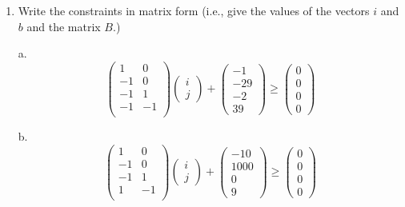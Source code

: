 \documentclass[11pt]{article}
\begin{document}
\begin{enumerate}
\begin{Answer}
\begin{figure}[H]
		      \end{figure}
	      \end{Answer}
	      \newpage
	\item Write the constraints in matrix form (i.e., give the values of the vectors $i$ and $b$ and the matrix $B$.)
	      \begin{Answer}
		      a.
		      $$
			      \begin{pmatrix}
				      1  & 0  \\
				      -1 & 0  \\
				      -1 & 1  \\
				      -1 & -1 \\
			      \end{pmatrix}
			      \begin{pmatrix}
				      i \\
				      j
			      \end{pmatrix}
			      +
			      \begin{pmatrix}
				      -1  \\
				      -29 \\
				      -2  \\
				      39
			      \end{pmatrix}
			      \ge
			      \begin{pmatrix}
				      0 \\
				      0 \\
				      0 \\
				      0
			      \end{pmatrix}
		      $$

		      b.
		      $$
			      \begin{pmatrix}
				      1  & 0  \\
				      -1 & 0  \\
				      -1 & 1  \\
				      1  & -1 \\
			      \end{pmatrix}
			      \begin{pmatrix}
				      i \\
				      j
			      \end{pmatrix}
			      +
			      \begin{pmatrix}
				      -10  \\
				      1000 \\
				      0    \\
				      9
			      \end{pmatrix}
			      \ge
			      \begin{pmatrix}
				      0 \\
				      0 \\
				      0 \\
				      0
			      \end{pmatrix}
		      $$


\end{Answer}
\end{enumerate}
\end{document}
